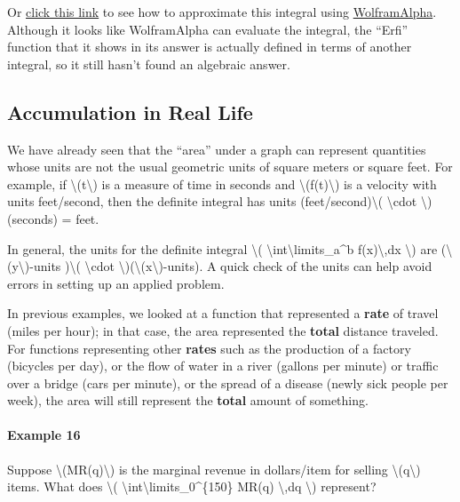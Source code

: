 Or
\href{http://www.wolframalpha.com/input/?i=integrate+e\%5E(x\%5E2\%2Bx)+from+1+to+2}{click
this link} to see how to approximate this integral using
\href{http://www.wolframalpha.com/}{Wolfram\textbar{}Alpha}. Although it
looks like Wolfram\textbar{}Alpha can evaluate the integral, the
``Erfi'' function that it shows in its answer is actually defined in
terms of another integral, so it still hasn't found an algebraic answer.

\hypertarget{accumulation-in-real-life}{%
\subsection{Accumulation in Real Life}\label{accumulation-in-real-life}}

We have already seen that the ``area'' under a graph can represent
quantities whose units are not the usual geometric units of square
meters or square feet. For example, if
\textbackslash{}(t\textbackslash{}) is a measure of time in seconds and
\textbackslash{}(f(t)\textbackslash{}) is a velocity with units
feet/second, then the definite integral has units
(feet/second)\textbackslash{}( \textbackslash{}cdot
\textbackslash{})(seconds) = feet.

In general, the units for the definite integral \textbackslash{}(
\textbackslash{}int\textbackslash{}limits\_a\^{}b
f(x)\textbackslash{},dx \textbackslash{}) are
(\textbackslash{}(y\textbackslash{})-units )\textbackslash{}(
\textbackslash{}cdot
\textbackslash{})(\textbackslash{}(x\textbackslash{})-units). A quick
check of the units can help avoid errors in setting up an applied
problem.

In previous examples, we looked at a function that represented a
\textbf{rate} of travel (miles per hour); in that case, the area
represented the \textbf{total} distance traveled. For functions
representing other \textbf{rates} such as the production of a factory
(bicycles per day), or the flow of water in a river (gallons per minute)
or traffic over a bridge (cars per minute), or the spread of a disease
(newly sick people per week), the area will still represent the
\textbf{total} amount of something.

\hypertarget{example-16}{%
\paragraph{Example 16}\label{example-16}}

Suppose \textbackslash{}(MR(q)\textbackslash{}) is the marginal revenue
in dollars/item for selling \textbackslash{}(q\textbackslash{}) items.
What does \textbackslash{}(
\textbackslash{}int\textbackslash{}limits\_0\^{}\{150\} MR(q)
\textbackslash{},dq \textbackslash{}) represent?

